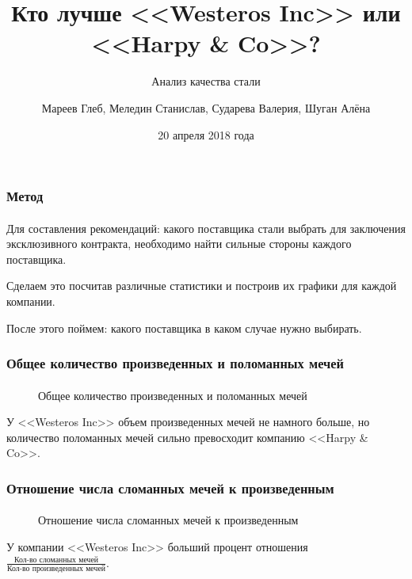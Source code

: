 \documentclass[10pt,pdf,hyperref={unicode}]{beamer}
\title{Кто лучше <<Westeros Inc>> или <<Harpy \& Co>>?}
\subtitle{Анализ качества стали}
\author{
Мареев Глеб, Меледин Станислав, Сударева Валерия, Шуган Алёна}
\date{20 апреля 2018 года}
\begin{document}
\begin{frame}
\titlepage
\end{frame} 

\begin{frame}
\frametitle{Метод} 
\framesubtitle{}
Для составления рекомендаций: какого поставщика стали выбрать для заключения эксклюзивного контракта, необходимо найти сильные стороны каждого поставщика. 

Сделаем это посчитав различные статистики и построив их графики для каждой компании.

После этого поймем: какого поставщика в каком случае нужно выбирать.
\end{frame}


\begin{frame}
\frametitle{Общее количество произведенных и поломанных мечей} 
\framesubtitle{}

\begin{minipage}{0.4\textwidth}
 	\begin{figure}[L]
		\caption{Общее количество произведенных и поломанных мечей}	
	\end{figure}
\end{minipage}
\hfill
\begin{minipage}{0.4\textwidth}
	У <<Westeros Inc>> объем произведенных мечей не намного больше, но количество поломанных мечей сильно превосходит компанию <<Harpy & Co>>.   
\end{minipage}
\end{frame}

\begin{frame}
\frametitle{Отношение числа сломанных мечей к произведенным} 
\framesubtitle{}

\begin{minipage}{0.4\textwidth}
 	\begin{figure}[L]
		\caption{Отношение числа сломанных мечей к произведенным}		
	\end{figure}
\end{minipage}
\hfill
\begin{minipage}{0.4\textwidth}
	У компании <<Westeros Inc>> больший процент отношения $\frac{\text{Кол-во сломанных мечей}}{\text{Кол-во произведенных мечей}}$. 
\end{minipage}
\end{frame}
\end{document}
